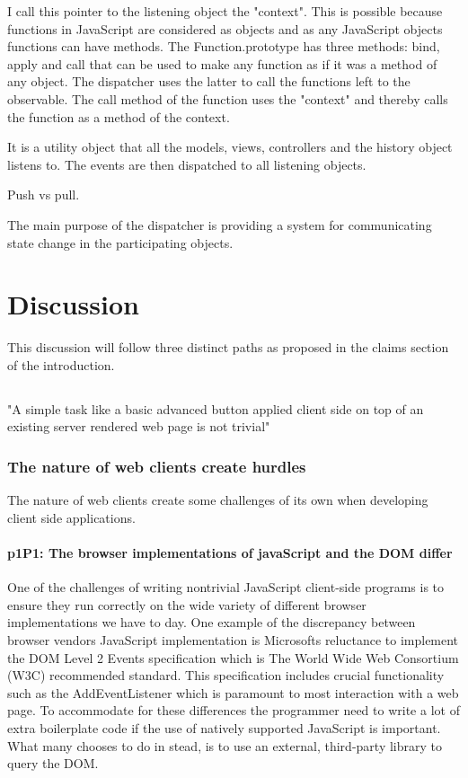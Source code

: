 \documentclass[english]{ifimaster}
\begin{document}
I call this pointer to the listening object the "context". This is possible because functions in JavaScript are considered as objects and as any JavaScript objects functions can have methods.
The Function.prototype has three methods: bind, apply and call that can be used to make any function as if it was a method of any object. The dispatcher uses the latter to call the functions left to the observable. The call method of the function uses the "context" and thereby calls the function as a method of the context.

It is a utility object that all the models, views, controllers and the history object listens to. The events are then dispatched to all listening objects. 

Push vs pull.

The main purpose of the dispatcher is providing a system for communicating state change in the participating objects.  

\part{Discussion}

This discussion will follow three distinct paths as proposed in the claims section of the introduction.

\chapter{}
"A simple task like a basic advanced button applied client side on top of an existing server rendered web page is not trivial"

\section{The nature of web clients create hurdles}
The nature of web clients create some challenges of its own when developing client side applications. 

\subsection{p1P1: The browser implementations of javaScript and the DOM differ}
One of the challenges of writing nontrivial JavaScript client-side programs is to ensure they run correctly on the wide variety of different browser implementations we have to day\parencite[p. 325]{flanagan}. One example of the discrepancy between browser vendors JavaScript implementation is Microsofts reluctance to implement the DOM Level 2 Events specification which is The World Wide Web Consortium (W3C) recommended standard\parencite{w3c}. This specification includes crucial functionality such as the AddEventListener which is paramount to most interaction with a web page. To accommodate for these differences the programmer need to write a lot of extra boilerplate code if the use of natively supported JavaScript is important. What many chooses to do in stead, is to use an external, third-party library to query the DOM. 
\end{document}
